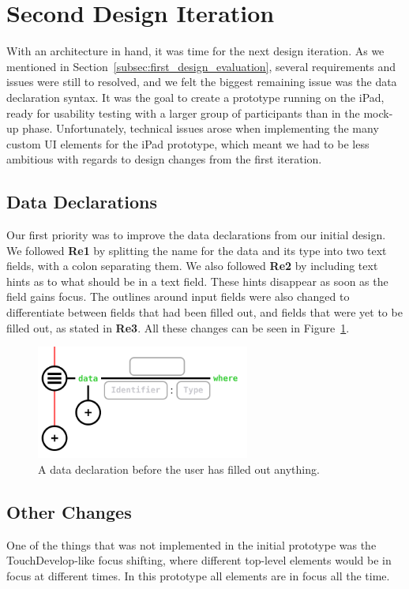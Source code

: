 \section{Second Design Iteration}
\label{sec:Implementation}

With an architecture in hand, it was time for the next design iteration.
As we mentioned in Section~\ref{subsec:first_design_evaluation}, several requirements and issues were still to resolved, and we felt the biggest remaining issue was the data declaration syntax.
It was the goal to create a prototype running on the iPad, ready for usability testing with a larger group of participants than in the mock-up phase.
Unfortunately, technical issues arose when implementing the many custom UI elements for the iPad prototype, which meant we had to be less ambitious with regards to design changes from the first iteration.

\subsection{Data Declarations}
\label{subsec:second_data_declarations}
Our first priority was to improve the data declarations from our initial design. 
We followed \textbf{Re1} by splitting the name for the data and its type into two text fields, with a colon separating them. 
We also followed \textbf{Re2} by including text hints as to what should be in a text field.
These hints disappear as soon as the field gains focus.
The outlines around input fields were also changed to differentiate between fields that had been filled out, and fields that were yet to be filled out, as stated in \textbf{Re3}.
All these changes can be seen in Figure~\ref{fig:data_declaration}.

\begin{figure}
	\centering
		\includegraphics[width=70mm]{diagrams/data_declaration.png}
	\caption{A data declaration before the user has filled out anything.}
\label{fig:data_declaration}
\end{figure}

\subsection{Other Changes}
\label{subsec:other_changes}
One of the things that was not implemented in the initial prototype was the
TouchDevelop-like focus shifting, where different top-level elements would be
in focus at different times. In this prototype all elements are in focus all
the time.

